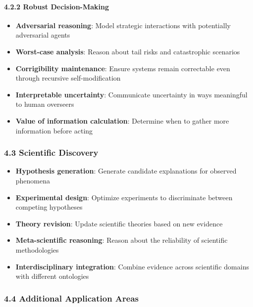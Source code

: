 \documentclass[
]{article}
\providecommand{\tightlist}{%
  \setlength{\itemsep}{0pt}\setlength{\parskip}{0pt}}
\begin{document}
\paragraph{4.2.2 Robust Decision-Making}\label{robust-decision-making}

\begin{itemize}
\tightlist
\item
  \textbf{Adversarial reasoning}: Model strategic interactions with
  potentially adversarial agents
\item
  \textbf{Worst-case analysis}: Reason about tail risks and catastrophic
  scenarios
\item
  \textbf{Corrigibility maintenance}: Ensure systems remain correctable
  even through recursive self-modification
\item
  \textbf{Interpretable uncertainty}: Communicate uncertainty in ways
  meaningful to human overseers
\item
  \textbf{Value of information calculation}: Determine when to gather
  more information before acting
\end{itemize}

\subsubsection{4.3 Scientific Discovery}\label{scientific-discovery}

\begin{itemize}
\tightlist
\item
  \textbf{Hypothesis generation}: Generate candidate explanations for
  observed phenomena
\item
  \textbf{Experimental design}: Optimize experiments to discriminate
  between competing hypotheses
\item
  \textbf{Theory revision}: Update scientific theories based on new
  evidence
\item
  \textbf{Meta-scientific reasoning}: Reason about the reliability of
  scientific methodologies
\item
  \textbf{Interdisciplinary integration}: Combine evidence across
  scientific domains with different ontologies
\end{itemize}

\subsubsection{4.4 Additional Application
Areas}\label{additional-application-areas-1}
\end{document}
